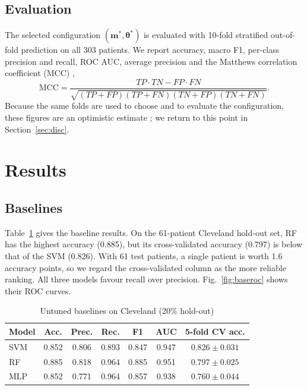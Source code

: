 \documentclass[conference]{IEEEtran}
\begin{document}
\subsection{Evaluation}
The selected configuration $(\mathbf{m}^{*},\boldsymbol{\theta}^{*})$ is evaluated with 10-fold stratified out-of-fold prediction on all 303 patients. We report accuracy, macro F1, per-class precision and recall, ROC AUC, average precision and the Matthews correlation coefficient (MCC) \cite{chicco2020mcc},
\begin{equation}
\mathrm{MCC}=\frac{TP\cdot TN-FP\cdot FN}{\sqrt{(TP+FP)(TP+FN)(TN+FP)(TN+FN)}}.
\end{equation}
Because the same folds are used to choose and to evaluate the configuration, these figures are an optimistic estimate \cite{varma2006bias}; we return to this point in Section~\ref{sec:disc}.

\section{Results}

\subsection{Baselines}
Table~\ref{tab:base} gives the baseline results. On the 61-patient Cleveland hold-out set, RF has the highest accuracy (0.885), but its cross-validated accuracy (0.797) is below that of the SVM (0.826). With 61 test patients, a single patient is worth 1.6 accuracy points, so we regard the cross-validated column as the more reliable ranking. All three models favour recall over precision. Fig.~\ref{fig:baseroc} shows their ROC curves.

\begin{table}[t]
\caption{Untuned baselines on Cleveland (20\% hold-out)}
\label{tab:base}
\centering
\setlength{\tabcolsep}{3.5pt}
\begin{tabular}{@{}lcccccc@{}}
\toprule
Model & Acc. & Prec. & Rec. & F1 & AUC & 5-fold CV acc. \\ \midrule
SVM & 0.852 & 0.806 & 0.893 & 0.847 & 0.947 & $0.826\pm0.031$ \\
RF  & 0.885 & 0.818 & 0.964 & 0.885 & 0.951 & $0.797\pm0.025$ \\
MLP & 0.852 & 0.771 & 0.964 & 0.857 & 0.938 & $0.760\pm0.044$ \\ \bottomrule
\end{tabular}
\end{table}
\end{document}
